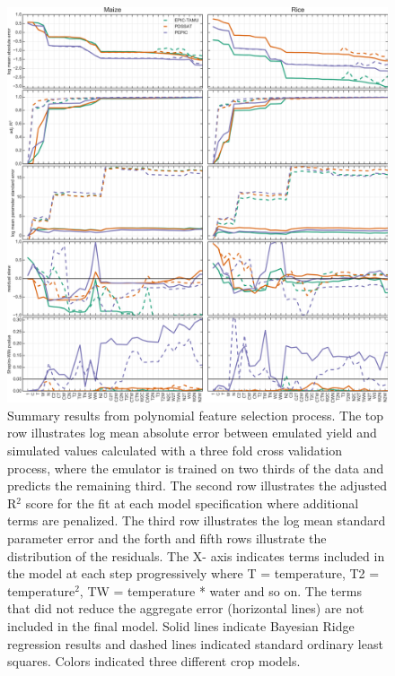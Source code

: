 \documentclass[gmd, manuscript]{copernicus} %
\begin{document}
\begin{figure}[ht]
\centering
   \includegraphics[width=12cm]{figures/model_select_maize_rice.png}
   \caption{Summary results from polynomial feature selection process.
   The top row illustrates log mean absolute error between emulated yield and simulated values calculated with a three fold cross validation process, where the emulator is trained on two thirds of the data and predicts the remaining third.
   The second row illustrates the adjusted R$^2$ score for the fit at each model specification where additional terms are penalized.
   The third row illustrates the log mean standard parameter error and the forth and fifth rows illustrate the distribution of the residuals.
   The X- axis indicates terms included in the model at each step progressively where T = temperature, T2 = temperature$^{2}$, TW  = temperature * water and so on. 
   The terms that did not reduce the aggregate error (horizontal lines) are not included in the final model. 
   Solid lines indicate Bayesian Ridge regression results and dashed lines indicated standard ordinary least squares. 
   Colors indicated three different crop models.}
   \label{fig:features}
\end{figure}
\end{document}
